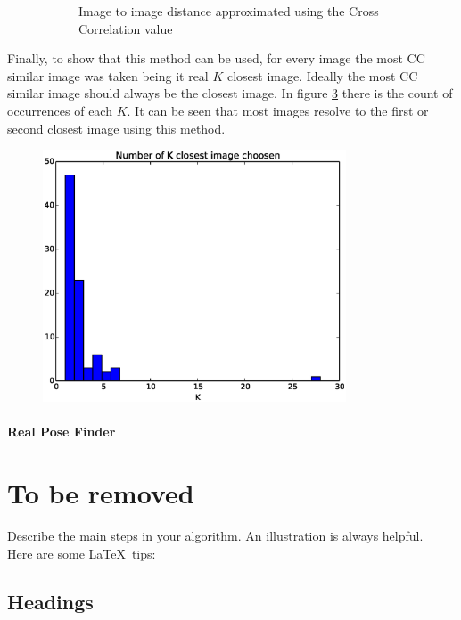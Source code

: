 \begin{figure}
\begin{subfigure}[b]{0.60\linewidth}
         \caption{Image to image distance approximated using the Cross Correlation value}                
         \label{fig:CC_confusion_matrix}
  \end{subfigure}
  \caption{}
\end{figure}


Finally, to show that this method can be used, for every image the most CC similar image was taken being it real $K$ closest image. Ideally the most CC similar image should always be the closest image. In figure \ref{fig:K_closest} there is the count of occurrences of each $K$. It can be seen that most images resolve to the first or second closest image using this method.\\

\begin{figure}[!htbp]
  \centering
  \includegraphics[width=9cm]{img/demo_1_1_CC_choose_distribution.eps}
  \caption{}
  \label{fig:K_closest}
\end{figure}



\subsubsection{Real Pose Finder}
\label{ssub:real_pose_finder}

\chapter{To be removed}
\label{cha:chapter_name}



Describe the main steps in your algorithm. An illustration is always helpful.\\

Here are some \LaTeX~tips:


\section{Headings}

